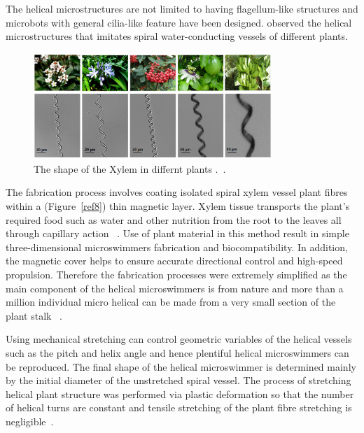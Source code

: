 \documentclass[a4paper,11pt]{article}
\begin{document}
\begin{sloppypar}

The helical microstructures are not limited to having flagellum-like structures and microbots with
general cilia-like feature have been designed. \citeauthor{gao2013bioinspired}
 observed the helical microstructures that imitates spiral water-conducting vessels of different plants. 

\begin{figure}
  \centering
    \includegraphics[width=0.8\textwidth]{plants}
  \caption{The shape of the Xylem in differnt plants .~\citep{mahoney2011velocity}.}
  \label{plants}
\end{figure}



The fabrication process involves coating isolated spiral xylem vessel plant fibres within a (Figure~\ref{ref8})
thin magnetic layer. Xylem tissue transports the plant\rq{}s required food such as water and other 
nutrition from the root to the leaves all through capillary action ~\citep{mahoney2011velocity}.
Use of plant material in this method result in simple three-dimensional microswimmers fabrication 
and biocompatibility. In addition, the magnetic cover helps to ensure accurate directional control and 
high-speed propulsion. Therefore the fabrication processes were extremely simplified as the main 
component of the helical microswimmers is from nature and more than a million individual micro helical 
can be made from a very small section of the plant stalk ~\citep{mahoney2011velocity}. 

Using mechanical stretching can control geometric variables of the helical vessels such as the pitch and
 helix angle and hence plentiful helical microswimmers can be reproduced. The final shape of the 
helical microswimmer is determined mainly by the initial diameter of the unstretched spiral vessel. The
 process of stretching helical plant structure was performed via plastic deformation so that the number 
of helical turns are constant and tensile stretching of the plant fibre stretching is negligible~\citep{mahoney2011velocity}. 


\end{sloppypar}
\end{document}
